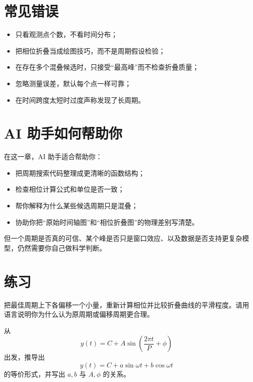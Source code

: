 \section{常见错误}

\begin{warnbox}[时间序列分析中的典型问题]
\begin{itemize}
    \item 只看观测点个数，不看时间分布；
    \item 把相位折叠当成绘图技巧，而不是周期假设检验；
    \item 在存在多个混叠候选时，只接受“最高峰”而不检查折叠质量；
    \item 忽略测量误差，默认每个点一样可靠；
    \item 在时间跨度太短时过度声称发现了长周期。
\end{itemize}
\end{warnbox}

\section{AI 助手如何帮助你}

在这一章，AI 助手适合帮助你：

\begin{itemize}
    \item 把周期搜索代码整理成更清晰的函数结构；
    \item 检查相位计算公式和单位是否一致；
    \item 帮你解释为什么某些候选周期只是混叠；
    \item 协助你把“原始时间轴图”和“相位折叠图”的物理差别写清楚。
\end{itemize}

但一个周期是否真的可信、某个峰是否只是窗口效应、以及数据是否支持更复杂模型，仍然需要你自己做科学判断。

\section{练习}

\begin{exercisebox}[基础练习]
把最佳周期上下各偏移一个小量，重新计算相位并比较折叠曲线的平滑程度。请用语言说明你为什么认为原周期或偏移周期更合理。
\end{exercisebox}

\begin{exercisebox}[进阶练习]
从
\[
y(t) = C + A\sin\left(\frac{2\pi t}{P} + \phi\right)
\]
出发，推导出
\[
y(t) = C + a\sin\omega t + b\cos\omega t
\]
的等价形式，并写出 $a,b$ 与 $A,\phi$ 的关系。
\end{exercisebox}

